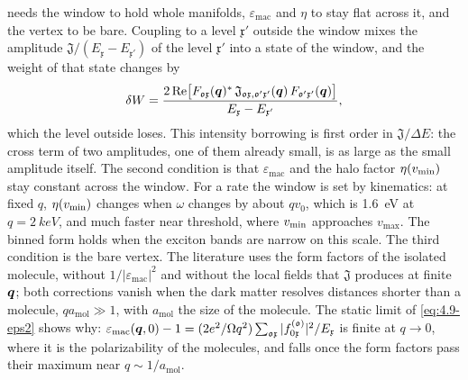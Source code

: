  needs the window to hold whole manifolds, $\varepsilon_{\mathrm{mac}}$ and $\eta$ to stay flat across it, and the vertex to be bare. Coupling to a level $\mathfrak{x}'$ outside the window mixes the amplitude $\mathfrak{J}/(E_{\mathfrak{x}} - E_{\mathfrak{x}'})$ of the level $\mathfrak{x}'$ into a state of the window, and the weight of that state changes by
\begin{equation}
  \delta W = \frac{2\operatorname{Re}\bigl[F_{\mathfrak{o}\mathfrak{x}}(\bm{q})^*\,\mathfrak{J}_{\mathfrak{o}\mathfrak{x},\mathfrak{o}'\mathfrak{x}'}(\bm{q})\,F_{\mathfrak{o}'\mathfrak{x}'}(\bm{q})\bigr]}{E_{\mathfrak{x}} - E_{\mathfrak{x}'}} ,
  \label{eq:16.4-borrow}
\end{equation}
which the level outside loses. This intensity borrowing is first order in $\mathfrak{J}/\Delta E$: the cross term of two amplitudes, one of them already small, is as large as the small amplitude itself. The second condition is that $\varepsilon_{\mathrm{mac}}$ and the halo factor $\eta(v_{\mathrm{min}})$ stay constant across the window. For a rate the window is set by kinematics: at fixed $q$, $\eta(v_{\mathrm{min}})$ changes when $\omega$ changes by about $qv_0$, which is \SI{1.6}{eV} at $q = \SI{2}{keV}$, and much faster near threshold, where $v_{\mathrm{min}}$ approaches $v_{\mathrm{max}}$. The binned form holds when the exciton bands are narrow on this scale. The third condition is the bare vertex. The literature uses the form factors of the isolated molecule, without $1/|\varepsilon_{\mathrm{mac}}|^2$ and without the local fields that $\mathfrak{J}$ produces at finite $\bm{q}$; both corrections vanish when the dark matter resolves distances shorter than a molecule, $qa_{\mathrm{mol}} \gg 1$, with $a_{\mathrm{mol}}$ the size of the molecule. The static limit of \cref{eq:4.9-eps2} shows why: $\varepsilon_{\mathrm{mac}}(\bm{q},0) - 1 = (2e^2/\Omega q^2)\sum_{\mathfrak{o}\mathfrak{x}}|f^{(\mathfrak{o})}_{0\mathfrak{x}}|^2/E_{\mathfrak{x}}$ is finite at $q \to 0$, where it is the polarizability of the molecules, and falls once the form factors pass their maximum near $q \sim 1/a_{\mathrm{mol}}$.

